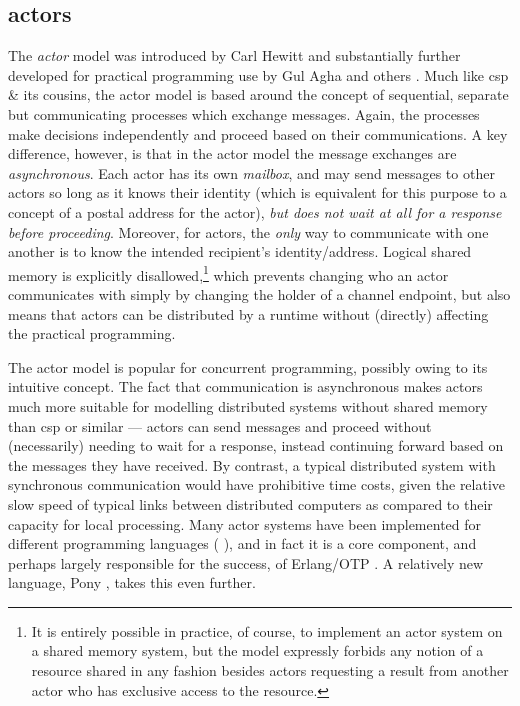 \subsection{\label{subsec:back:actors}\texorpdfstring{\Glspl{actor}}{Actors}}
The \emph{\gls{actor}} model was introduced by Carl Hewitt \cite{Hewitt1973} and substantially further developed for practical programming use by Gul Agha and others \cite{Agha1986,Agha1997}.  Much like \gls{csp} \& its cousins, the \gls{actor} model is based around the concept of sequential, separate but communicating processes which exchange messages.  Again, the processes make decisions independently and proceed based on their communications.  A key difference, however, is that in the \gls{actor} model the message exchanges are \emph{asynchronous}.  Each \gls{actor} has its own \emph{mailbox}, and may send messages to other \glspl{actor} so long as it knows their identity (which is equivalent for this purpose to a concept of a postal address for the \gls{actor}), \emph{but does not wait at all for a response before proceeding}.  Moreover, for \glspl{actor}, the \emph{only} way to communicate with one another is to know the intended recipient's identity/address.  Logical shared memory is explicitly disallowed,\footnote{It is entirely possible in practice, of course, to implement an \gls{actor} system on a shared memory system, but the model expressly forbids any notion of a resource shared in any fashion besides \glspl{actor} requesting a result from another \gls{actor} who has exclusive access to the resource.} which prevents changing who an \gls{actor} communicates with simply by \eg{} changing the holder of a channel endpoint, but also means that actors can be distributed by a runtime without (directly) affecting the practical programming.

The \gls{actor} model is popular for concurrent programming, possibly owing to its intuitive concept.  The fact that communication is asynchronous makes \glspl{actor} much more suitable for modelling distributed systems without shared memory than \gls{csp} or similar --- \glspl{actor} can send messages and proceed without (necessarily) needing to wait for a response, instead continuing forward based on the messages they have received.  By contrast, a typical distributed system with synchronous communication would have prohibitive time costs, given the relative slow speed of typical links between distributed computers as compared to their capacity for local processing.  Many \gls{actor} systems have been implemented for different programming languages (\eg{} \cite{Varela2001,Srinivasan2008,Charousset2016,Bernstein2016}), and in fact it is a core component, and perhaps largely responsible for the success, of Erlang/OTP \cite{Armstrong2010,Armstrong2013,Vinoski2012}.  A relatively new language, Pony \cite{Clebsch2015,Clebsch2017}, takes this even further.

